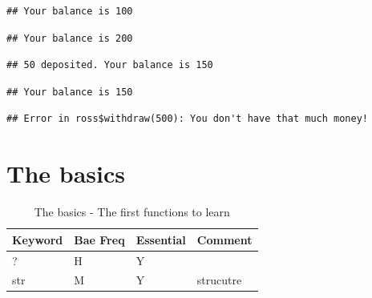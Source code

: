 \documentclass[11pt,]{krantz}
\makeatletter
\newenvironment{Shaded}{\begin{snugshade}}{\end{snugshade}}
\newcommand{\KeywordTok}[1]{\textcolor[rgb]{0.13,0.29,0.53}{\textbf{#1}}}
\newcommand{\DecValTok}[1]{\textcolor[rgb]{0.00,0.00,0.81}{#1}}
\newcommand{\OperatorTok}[1]{\textcolor[rgb]{0.81,0.36,0.00}{\textbf{#1}}}
\newcommand{\NormalTok}[1]{#1}
\newenvironment{kframe}{%
\medskip{}
\setlength{\fboxsep}{.8em}
 \def\at@end@of@kframe{}%
 \ifinner\ifhmode%
  \def\at@end@of@kframe{\end{minipage}}%
  \begin{minipage}{\columnwidth}%
 \fi\fi%
 \def\FrameCommand##1{\hskip\@totalleftmargin \hskip-\fboxsep
 \colorbox{shadecolor}{##1}\hskip-\fboxsep
     \hskip-\linewidth \hskip-\@totalleftmargin \hskip\columnwidth}%
 \MakeFramed {\advance\hsize-\width
   \@totalleftmargin\z@ \linewidth\hsize
   \@setminipage}}%
 {\par\unskip\endMakeFramed%
 \at@end@of@kframe}
\renewenvironment{Shaded}{\begin{kframe}}{\end{kframe}}
\theoremstyle{definition}
\theoremstyle{definition}
\theoremstyle{remark}
\makeatother
\begin{document}
\begin{verbatim}
## Your balance is 100
\end{verbatim}

\begin{Shaded}
\end{Shaded}

\begin{verbatim}
## Your balance is 200
\end{verbatim}

\begin{Shaded}
\end{Shaded}

\begin{verbatim}
## 50 deposited. Your balance is 150
\end{verbatim}

\begin{Shaded}
\end{Shaded}

\begin{verbatim}
## Your balance is 150
\end{verbatim}

\begin{Shaded}
\end{Shaded}

\begin{verbatim}
## Error in ross$withdraw(500): You don't have that much money!
\end{verbatim}

\section{The basics}\label{the-basics}

\begin{table}

\caption{\label{tab:knitchunk1}The basics - The first functions to learn}
\centering
\begin{tabular}[t]{llll}
\toprule
Keyword & Bae Freq & Essential & Comment\\
\midrule
? & H & Y & \\
str & M & Y & strucutre\\
\bottomrule
\end{tabular}
\end{table}
\end{document}
